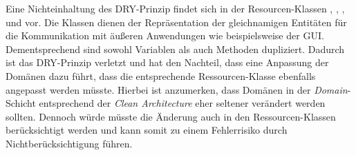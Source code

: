 
Eine Nichteinhaltung des \ac{DRY}-Prinzip findet sich in der Resourcen-Klassen , , ,  und  vor.
Die Klassen dienen der Repräsentation der gleichnamigen Entitäten für die Kommunikation mit äußeren Anwendungen wie beispielsweise der \ac{GUI}.
Dementsprechend sind sowohl Variablen als auch Methoden dupliziert.
Dadurch ist das \ac{DRY}-Prinzip verletzt und hat den Nachteil, dass eine Anpassung der Domänen dazu führt, dass die entsprechende Ressourcen-Klasse ebenfalls angepasst werden müsste.
Hierbei ist anzumerken, dass Domänen in der \textit{Domain}-Schicht entsprechend der \textit{Clean Architecture} eher seltener verändert werden sollten.
Dennoch würde müsste die Änderung auch in den Ressourcen-Klassen berücksichtigt werden und kann somit zu einem Fehlerrisiko durch Nichtberücksichtigung führen.
